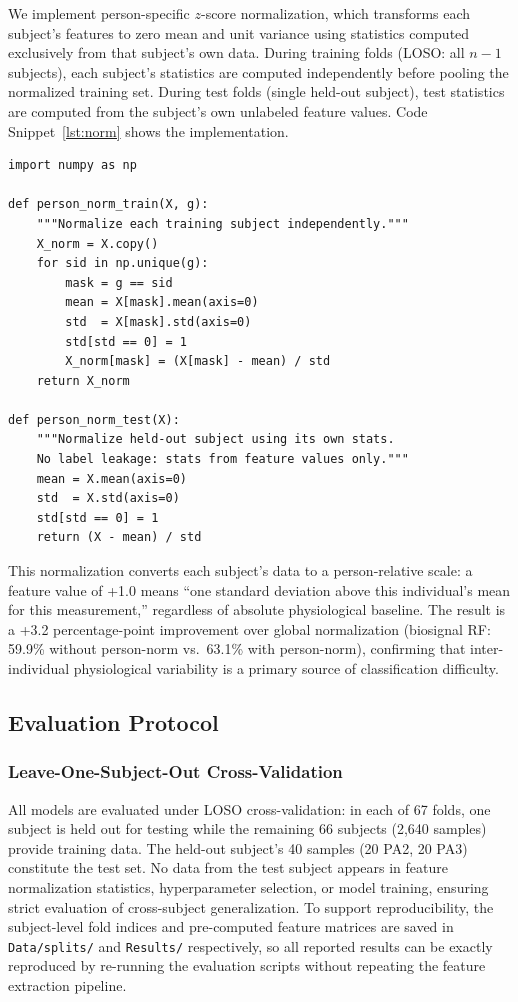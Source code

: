 \documentclass[10pt, twocolumn]{article}
\begin{document}
We implement person-specific $z$-score normalization, which transforms each subject's
features to zero mean and unit variance using statistics computed exclusively from that
subject's own data. During training folds (LOSO: all $n-1$ subjects), each subject's
statistics are computed independently before pooling the normalized training set. During
test folds (single held-out subject), test statistics are computed from the subject's own
unlabeled feature values. Code Snippet~\ref{lst:norm} shows the implementation.

\begin{lstlisting}[caption={Person-specific $z$-score normalization for train and test folds. \texttt{X} is an (N, D) feature matrix; \texttt{g} is a length-N subject ID array.}, label={lst:norm}]
import numpy as np

def person_norm_train(X, g):
    """Normalize each training subject independently."""
    X_norm = X.copy()
    for sid in np.unique(g):
        mask = g == sid
        mean = X[mask].mean(axis=0)
        std  = X[mask].std(axis=0)
        std[std == 0] = 1
        X_norm[mask] = (X[mask] - mean) / std
    return X_norm

def person_norm_test(X):
    """Normalize held-out subject using its own stats.
    No label leakage: stats from feature values only."""
    mean = X.mean(axis=0)
    std  = X.std(axis=0)
    std[std == 0] = 1
    return (X - mean) / std
\end{lstlisting}

This normalization converts each subject's data to a person-relative scale: a feature
value of +1.0 means ``one standard deviation above this individual's mean for this
measurement,'' regardless of absolute physiological baseline. The result is a +3.2
percentage-point improvement over global normalization (biosignal RF: 59.9\% without
person-norm vs.\ 63.1\% with person-norm), confirming that inter-individual physiological
variability is a primary source of classification difficulty.

\subsection{Evaluation Protocol}

\subsubsection{Leave-One-Subject-Out Cross-Validation}

All models are evaluated under LOSO cross-validation: in each of 67 folds, one subject is
held out for testing while the remaining 66 subjects (2,640 samples) provide training data.
The held-out subject's 40 samples (20 PA2, 20 PA3) constitute the test set. No data from
the test subject appears in feature normalization statistics, hyperparameter selection, or
model training, ensuring strict evaluation of cross-subject generalization. To support
reproducibility, the subject-level fold indices and pre-computed feature matrices are
saved in \texttt{Data/splits/} and \texttt{Results/} respectively, so all reported
results can be exactly reproduced by re-running the evaluation scripts without repeating
the feature extraction pipeline.
\end{document}
